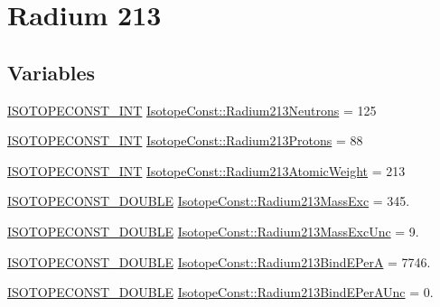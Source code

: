 \hypertarget{group___isotope_const-_radium-_ra213}{}\section{Radium 213}
\label{group___isotope_const-_radium-_ra213}
\subsection*{Variables}
\begin{DoxyCompactItemize}
\item 
\mbox{\hyperlink{group___isotope_const-_macros_ga5f18360b3e99483a35c32d789e62621c}{I\+S\+O\+T\+O\+P\+E\+C\+O\+N\+S\+T\+\_\+\+I\+NT}} \mbox{\hyperlink{group___isotope_const-_radium-_ra213_ga0e956b3c40d18dd9dcc6dab845d2a17b}{Isotope\+Const\+::\+Radium213\+Neutrons}} = 125
\item 
\mbox{\hyperlink{group___isotope_const-_macros_ga5f18360b3e99483a35c32d789e62621c}{I\+S\+O\+T\+O\+P\+E\+C\+O\+N\+S\+T\+\_\+\+I\+NT}} \mbox{\hyperlink{group___isotope_const-_radium-_ra213_ga08c848255015bba8872be753ed3e735a}{Isotope\+Const\+::\+Radium213\+Protons}} = 88
\item 
\mbox{\hyperlink{group___isotope_const-_macros_ga5f18360b3e99483a35c32d789e62621c}{I\+S\+O\+T\+O\+P\+E\+C\+O\+N\+S\+T\+\_\+\+I\+NT}} \mbox{\hyperlink{group___isotope_const-_radium-_ra213_ga5f3e116866637929f8df0e2f1b08d224}{Isotope\+Const\+::\+Radium213\+Atomic\+Weight}} = 213
\item 
\mbox{\hyperlink{group___isotope_const-_macros_ga8f45a7272ce02c0b4c65c44636ed719a}{I\+S\+O\+T\+O\+P\+E\+C\+O\+N\+S\+T\+\_\+\+D\+O\+U\+B\+LE}} \mbox{\hyperlink{group___isotope_const-_radium-_ra213_gae96fadeafa9c13b36a8403ea6c4d02ef}{Isotope\+Const\+::\+Radium213\+Mass\+Exc}} = 345.
\item 
\mbox{\hyperlink{group___isotope_const-_macros_ga8f45a7272ce02c0b4c65c44636ed719a}{I\+S\+O\+T\+O\+P\+E\+C\+O\+N\+S\+T\+\_\+\+D\+O\+U\+B\+LE}} \mbox{\hyperlink{group___isotope_const-_radium-_ra213_gafb4661a8d89a26837f8cbecf10fdb134}{Isotope\+Const\+::\+Radium213\+Mass\+Exc\+Unc}} = 9.
\item 
\mbox{\hyperlink{group___isotope_const-_macros_ga8f45a7272ce02c0b4c65c44636ed719a}{I\+S\+O\+T\+O\+P\+E\+C\+O\+N\+S\+T\+\_\+\+D\+O\+U\+B\+LE}} \mbox{\hyperlink{group___isotope_const-_radium-_ra213_ga05e37cb12a06f61fbec3bcdd26ab5b97}{Isotope\+Const\+::\+Radium213\+Bind\+E\+PerA}} = 7746.
\item 
\mbox{\hyperlink{group___isotope_const-_macros_ga8f45a7272ce02c0b4c65c44636ed719a}{I\+S\+O\+T\+O\+P\+E\+C\+O\+N\+S\+T\+\_\+\+D\+O\+U\+B\+LE}} \mbox{\hyperlink{group___isotope_const-_radium-_ra213_ga9b39f7fe738cd6eb32c37302e6140ab3}{Isotope\+Const\+::\+Radium213\+Bind\+E\+Per\+A\+Unc}} = 0.

\end{DoxyCompactItemize}
